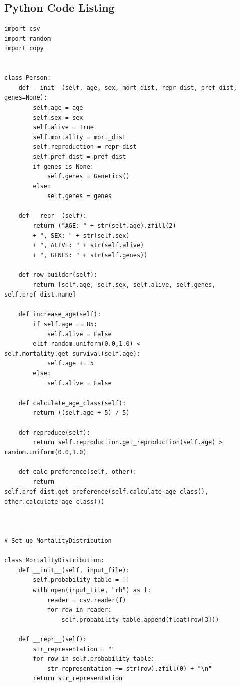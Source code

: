\documentclass[authoryearcitations]{UoYCSproject}
\begin{document}
\appendix
\begin{landscape}
\chapter{Python Code Listing}
\pagestyle{plain}
\scriptsize
\begin{verbatim}
import csv
import random
import copy


class Person:
    def __init__(self, age, sex, mort_dist, repr_dist, pref_dist, genes=None):
        self.age = age
        self.sex = sex
        self.alive = True
        self.mortality = mort_dist
        self.reproduction = repr_dist
        self.pref_dist = pref_dist
        if genes is None:
            self.genes = Genetics()
        else:
            self.genes = genes

    def __repr__(self):
        return ("AGE: " + str(self.age).zfill(2)
        + ", SEX: " + str(self.sex)
        + ", ALIVE: " + str(self.alive)
        + ", GENES: " + str(self.genes))

    def row_builder(self):
        return [self.age, self.sex, self.alive, self.genes, self.pref_dist.name]

    def increase_age(self):
        if self.age == 85:
            self.alive = False
        elif random.uniform(0.0,1.0) < self.mortality.get_survival(self.age):
            self.age += 5
        else:
            self.alive = False

    def calculate_age_class(self):
        return ((self.age + 5) / 5)

    def reproduce(self):
        return self.reproduction.get_reproduction(self.age) > random.uniform(0.0,1.0)

    def calc_preference(self, other):
        return self.pref_dist.get_preference(self.calculate_age_class(), other.calculate_age_class())



# Set up MortalityDistribution

class MortalityDistribution:
    def __init__(self, input_file):
        self.probability_table = []
        with open(input_file, "rb") as f:
            reader = csv.reader(f)
            for row in reader:
                self.probability_table.append(float(row[3]))

    def __repr__(self):
        str_representation = ""
        for row in self.probability_table:
            str_representation += str(row).zfill(0) + "\n"
        return str_representation


\end{verbatim}
\end{landscape}
\end{document}
